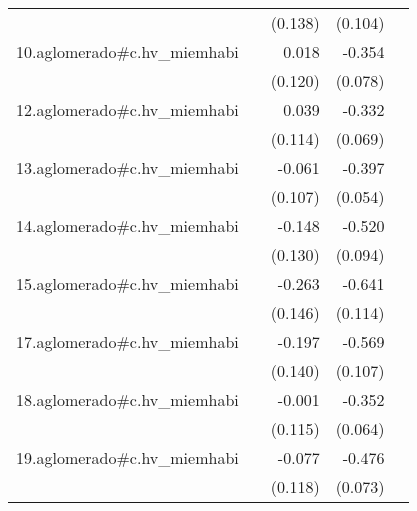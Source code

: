 {\begin{longtable}{l*{4}{D{.}{.}{-1}}}
            &                     &     (0.138)         &     (0.104)         &                     \\
\addlinespace
10.aglomerado#c.hv\_miemhabi&                     &       0.018         &      -0.354\sym{***}&                     \\
            &                     &     (0.120)         &     (0.078)         &                     \\
\addlinespace
12.aglomerado#c.hv\_miemhabi&                     &       0.039         &      -0.332\sym{***}&                     \\
            &                     &     (0.114)         &     (0.069)         &                     \\
\addlinespace
13.aglomerado#c.hv\_miemhabi&                     &      -0.061         &      -0.397\sym{***}&                     \\
            &                     &     (0.107)         &     (0.054)         &                     \\
\addlinespace
14.aglomerado#c.hv\_miemhabi&                     &      -0.148         &      -0.520\sym{***}&                     \\
            &                     &     (0.130)         &     (0.094)         &                     \\
\addlinespace
15.aglomerado#c.hv\_miemhabi&                     &      -0.263         &      -0.641\sym{***}&                     \\
            &                     &     (0.146)         &     (0.114)         &                     \\
\addlinespace
17.aglomerado#c.hv\_miemhabi&                     &      -0.197         &      -0.569\sym{***}&                     \\
            &                     &     (0.140)         &     (0.107)         &                     \\
\addlinespace
18.aglomerado#c.hv\_miemhabi&                     &      -0.001         &      -0.352\sym{***}&                     \\
            &                     &     (0.115)         &     (0.064)         &                     \\
\addlinespace
19.aglomerado#c.hv\_miemhabi&                     &      -0.077         &      -0.476\sym{***}&                     \\
            &                     &     (0.118)         &     (0.073)         &                     \\

\end{longtable}}
